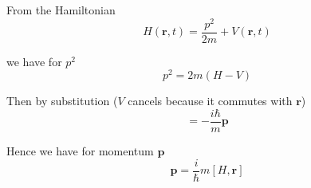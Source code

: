 From the Hamiltonian
\begin{equation*}
H(\mathbf r,t)=\frac{p^2}{2m}+V(\mathbf r,t)
\end{equation*}

we have for $p^2$
\begin{equation*}
p^2=2m(H-V)
\end{equation*}

Then by substitution ($V$ cancels because it commutes with $\mathbf r$)
\begin{equation*}
[H,\mathbf r]=-\frac{i\hbar}{m}\mathbf p
\end{equation*}

Hence we have for momentum $\mathbf p$
\begin{equation*}
\mathbf p=\frac{i}{\hbar}m[H,\mathbf r]
\end{equation*}



